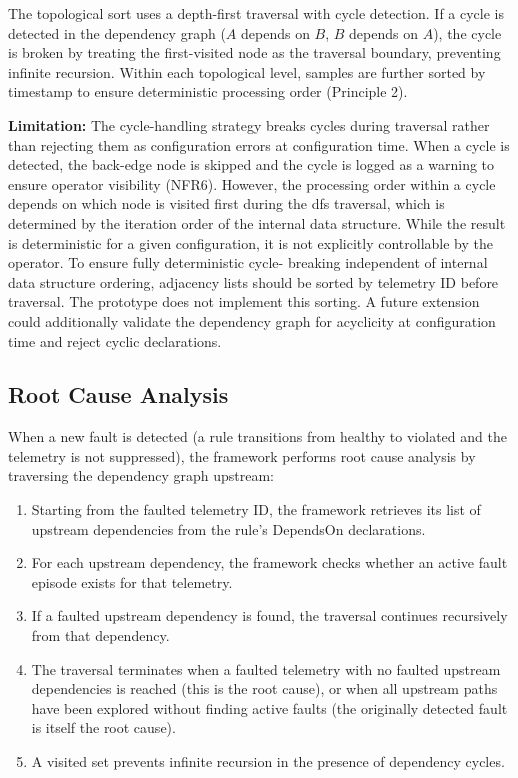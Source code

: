 The topological sort uses a depth-first traversal with cycle detection. If a cycle is detected in the dependency graph ($A$ depends on $B$, $B$ depends on $A$), the cycle is broken by treating the first-visited node as the traversal boundary, preventing infinite recursion. Within each topological level, samples are further sorted by timestamp to ensure deterministic processing order (Principle 2).

\textbf{Limitation:} The cycle-handling strategy breaks cycles during traversal rather than rejecting them as configuration errors at configuration time. When a cycle is detected, the back-edge node is skipped and the cycle is logged as a warning to ensure operator visibility (NFR6). However, the processing order within a cycle depends on which node is visited first during the \gls{dfs} traversal, which is determined by the iteration order of the internal data structure. While the result is deterministic for a given configuration, it is not explicitly controllable by the operator. To ensure fully deterministic cycle- breaking independent of internal data structure ordering, adjacency lists should be sorted by telemetry ID before traversal. The prototype does not implement this sorting. A future extension could additionally validate the dependency graph for acyclicity at configuration time and reject cyclic declarations.

\subsection{Root Cause Analysis}\label{sec:root-cause-analysis}

When a new fault is detected (a rule transitions from healthy to violated and the telemetry is not suppressed), the framework performs root cause analysis by traversing the dependency graph upstream:

\begin{enumerate}
\item Starting from the faulted telemetry ID, the framework retrieves its list of upstream dependencies from the rule's DependsOn declarations.
\item For each upstream dependency, the framework checks whether an active fault episode exists for that telemetry.
\item If a faulted upstream dependency is found, the traversal continues recursively from that dependency.
\item The traversal terminates when a faulted telemetry with no faulted upstream dependencies is reached (this is the root cause), or when all upstream paths have been explored without finding active faults (the originally detected fault is itself the root cause).
\item A visited set prevents infinite recursion in the presence of dependency cycles.
\end{enumerate}

